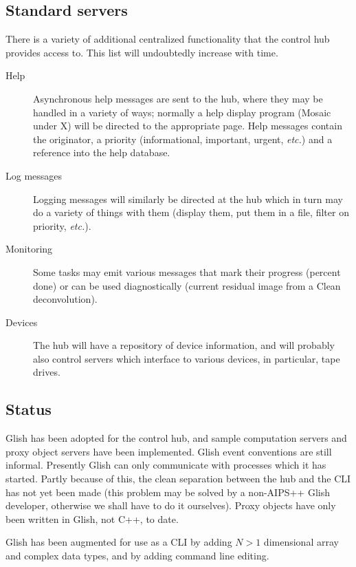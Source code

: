 \subsection{Standard servers}

There is a variety of additional centralized functionality that the
control hub provides access to. This list will undoubtedly increase
with time.

\begin{description}
\item[Help]
        Asynchronous help messages are sent to the hub, where they may
        be handled in a variety of ways; normally a help display
        program (Mosaic under X) will be directed to the appropriate
        page. Help messages contain the originator, a priority
        (informational, important, urgent, {\em etc.}) and a reference
        into the help database.
\item[Log messages]
        Logging messages will similarly be directed at the hub which
        in turn may do a variety of things with them (display them,
        put them in a file, filter on priority, {\em etc.}).
\item[Monitoring]
	Some tasks may emit various messages that mark their progress
	(percent done) or can be used diagnostically (current residual
	image from a Clean deconvolution).
\item[Devices]
        The hub will have a repository of device information, and will
        probably also control servers which interface to various
        devices, in particular,  tape drives.
\end{description}

\subsection{Status}

Glish has been adopted for the control hub, and sample computation
servers and proxy object servers have been implemented. Glish event
conventions are still informal. Presently Glish can only communicate
with processes which it has started. Partly because of this, the
clean separation between the hub and the CLI has not yet been made
(this problem may be solved by a non-AIPS++ Glish developer, otherwise
we shall have to do it ourselves). Proxy objects have only been
written in Glish, not C++, to date.

Glish has been augmented for use as a CLI by adding $N>1$
dimensional array and complex data types, and by adding command line
editing.

